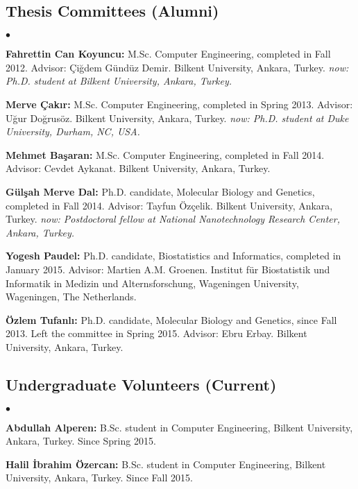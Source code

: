 \documentclass[margin,line]{res}
\newenvironment{list2}{
  \begin{list}{$\bullet$}{%
      \setlength{\itemsep}{0in}
      \setlength{\parsep}{0in} \setlength{\parskip}{0in}
      \setlength{\topsep}{0in} \setlength{\partopsep}{0in} 
      \setlength{\leftmargin}{0.2in}}}{\end{list}}
\begin{document}
\begin{resume}
\vspace*{-.6cm}
\subsection{\small \sc Thesis Committees (Alumni)}
\begin{list2}
\item
  {\bf Fahrettin Can Koyuncu:} M.Sc. Computer Engineering, completed in Fall 2012. Advisor: Çiğdem Gündüz Demir.
  Bilkent University, Ankara, Turkey. {\it now: Ph.D. student at Bilkent University, Ankara, Turkey.}
\item
  {\bf Merve Çakır:} M.Sc. Computer Engineering, completed in Spring 2013. Advisor: Uğur Doğrusöz.
  Bilkent University, Ankara, Turkey. {\it now: Ph.D. student at Duke University, Durham, NC, USA.}
\item
  {\bf Mehmet Başaran:} M.Sc. Computer Engineering, completed in Fall 2014. Advisor: Cevdet Aykanat.
  Bilkent University, Ankara, Turkey. %
\item
  {\bf G\"{u}l\c{s}ah Merve Dal:} Ph.D. candidate, Molecular Biology and Genetics, completed in Fall 2014.
  Advisor: Tayfun Özçelik.
  Bilkent University, Ankara, Turkey. {\it now: Postdoctoral fellow at National Nanotechnology Research Center, Ankara, Turkey.}
\item
  {\bf Yogesh Paudel:} Ph.D. candidate, Biostatistics and Informatics, completed in January 2015.
  Advisor: Martien A.M. Groenen.
  Institut für Biostatistik und Informatik in Medizin und Alternsforschung,  Wageningen University, Wageningen, The Netherlands.
\item
  {\bf Özlem Tufanlı:} Ph.D. candidate, Molecular Biology and Genetics, since Fall 2013. Left the committee in Spring 2015.
  Advisor: Ebru Erbay.
  Bilkent University, Ankara, Turkey.
  \end{list2}

  \vspace*{-.6cm}
  \subsection{\small \sc Undergraduate Volunteers (Current)}
  \begin{list2}
    \item 
      {\bf Abdullah Alperen:} B.Sc. student in Computer Engineering,  Bilkent University, Ankara, Turkey. Since Spring 2015. 
    \item 
      {\bf Halil İbrahim Özercan:} B.Sc. student in Computer Engineering,  Bilkent University, Ankara, Turkey. Since Fall 2015. 
  \end{list2}


\end{resume}
\end{document}
